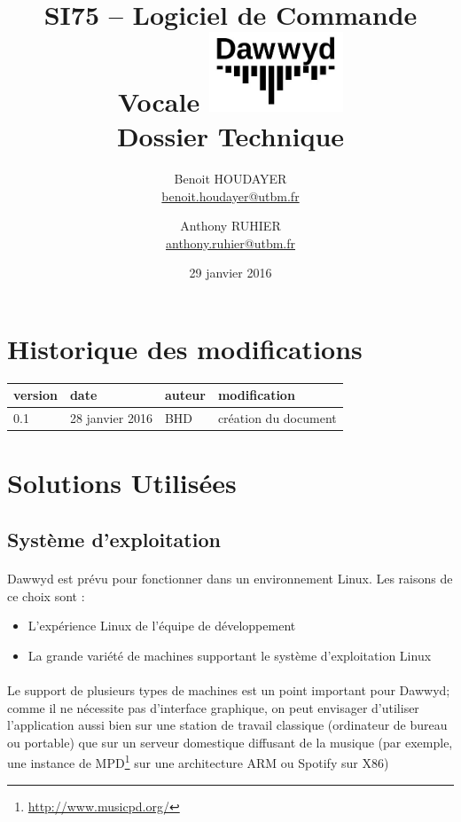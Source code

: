 \documentclass[12pt]{article}
\title{\vspace{-1cm}\textbf{%
    SI75 -- Logiciel de Commande Vocale \vspace{0.5cm}
    \protect\includegraphics[width=4cm]{logo.jpg}\\[0.5em]
    Dossier Technique}}
\author{Benoit HOUDAYER \\ \href{mailto:benoit.houdayer@utbm.fr}{benoit.houdayer@utbm.fr}
\and Anthony RUHIER \\ \href{mailto:anthony.ruhier@utbm.fr}{anthony.ruhier@utbm.fr}}
\date{29 janvier 2016}
\begin{document}
    \maketitle
    \thispagestyle{empty}
    \tableofcontents
    \listoffigures

    \section*{Historique des modifications}

    \begin{table}[H]
    \centering

    \begin{tabular}{|l|l|l|l|}
        \hline
        version & date & auteur & modification \\
        \hline
        0.1 & 28 janvier 2016 & BHD & création du document \\
        \hline
    \end{tabular}
    \end{table}

    \afterpage{\cfoot{\thepage}}
    \newpage

    \section{Solutions Utilisées}
	    \subsection{Système d'exploitation}
	    \paragraph{}
        Dawwyd est prévu pour fonctionner dans un environnement Linux. Les
        raisons de ce choix sont :
	    \begin{itemize}
	    	\item L'expérience Linux de l'équipe de développement
            \item La grande variété de machines supportant le système
                d'exploitation Linux
	    \end{itemize}

	    \paragraph{}
        Le support de plusieurs types de machines est un point important pour
        Dawwyd; comme il ne nécessite pas d'interface graphique, on peut
        envisager d'utiliser l'application aussi bien sur une station de
        travail classique (ordinateur de bureau ou portable) que sur un serveur
        domestique diffusant de la musique (par exemple, une instance de
        MPD\footnote{\url{http://www.musicpd.org/}} sur une architecture ARM ou
        Spotify sur X86)
\end{document}
